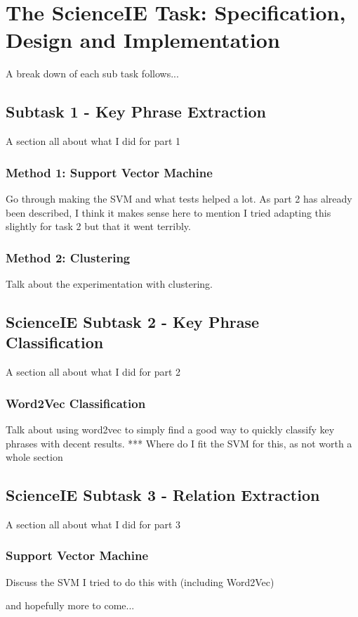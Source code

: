 \section{The ScienceIE Task: Specification, Design and Implementation}

A break down of each sub task follows...

\subsection{Subtask 1 - Key Phrase Extraction}
A section all about what I did for part 1
\subsubsection{Method 1: Support Vector Machine}
Go through making the SVM and what tests helped a lot. 
As part 2 has already been described, I think it makes sense here to mention I tried adapting this slightly for task 2 but that it went terribly.
\subsubsection{Method 2: Clustering}
Talk about the experimentation with clustering.

\subsection{ScienceIE Subtask 2 - Key Phrase Classification}
A section all about what I did for part 2
\subsubsection{Word2Vec Classification}
Talk about using word2vec to simply find a good way to quickly classify key phrases with decent results.
*** Where do I fit the SVM for this, as not worth a whole section

\subsection{ScienceIE Subtask 3 - Relation Extraction}
A section all about what I did for part 3
\subsubsection{Support Vector Machine}
Discuss the SVM I tried to do this with (including Word2Vec)

and hopefully more to come...
